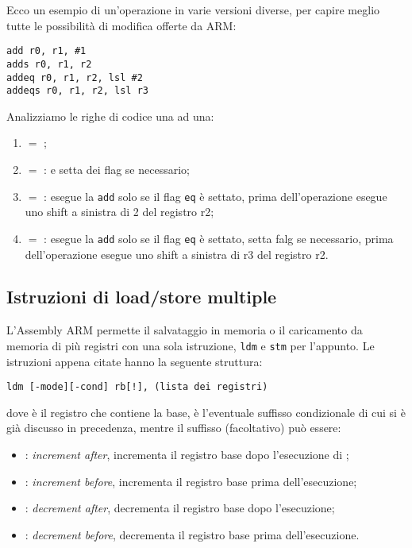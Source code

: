 \documentclass[class=book, crop=false, oneside]{standalone}
\begin{document}
Ecco un esempio di un'operazione in varie versioni diverse, per capire meglio tutte le possibilità di modifica offerte da ARM:
\begin{verbatim}
add r0, r1, #1
adds r0, r1, r2
addeq r0, r1, r2, lsl #2
addeqs r0, r1, r2, lsl r3
\end{verbatim}
Analizziamo le righe di codice una ad una:
\begin{enumerate}
	\item {} \(=\) ;
	\item {} \(=\) : e setta dei flag se necessario;
	\item {} \(=\) : esegue la \texttt{add} solo se il flag \texttt{eq} è settato, prima dell'operazione esegue uno shift a sinistra di 2 del registro r2;
	\item {} \(=\) : esegue la \texttt{add} solo se il flag \texttt{eq} è settato, setta falg se necessario, prima dell'operazione esegue uno shift a sinistra di r3 del registro r2.
\end{enumerate}

\subsection*{Istruzioni di load/store multiple}
L'Assembly ARM permette il salvataggio in memoria o il caricamento da memoria di più registri con una sola istruzione, \texttt{ldm} e \texttt{stm} per l'appunto. Le istruzioni appena citate hanno la seguente struttura:
\begin{center}
	\texttt{ldm [-mode][-cond] rb[!], (lista dei registri)}
\end{center}
dove  è il registro che contiene la base,  è l'eventuale suffisso condizionale di cui si è già discusso in precedenza, mentre il suffisso (facoltativo)  può essere:
\begin{itemize}
	\item {}: \emph{increment after}, incrementa il registro base dopo l'esecuzione di ;
	\item {}: \emph{increment before}, incrementa il registro base prima dell'esecuzione;
	\item {}: \emph{decrement after}, decrementa il registro base dopo l'esecuzione;
	\item {}: \emph{decrement before}, decrementa il registro base prima dell'esecuzione.
\end{itemize}
\end{document}
